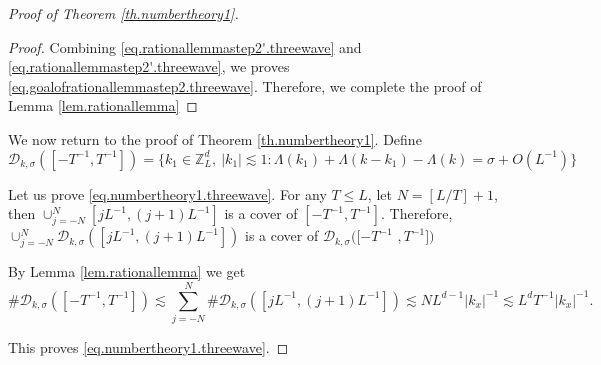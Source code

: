 \begin{proof}[Proof of Theorem \ref{th.numbertheory1}]
\begin{proof}
Combining \eqref{eq.rationallemmastep2'.threewave} and \eqref{eq.rationallemmastep2'.threewave}, we proves \eqref{eq.goalofrationallemmastep2.threewave}. Therefore, we complete the proof of Lemma \ref{lem.rationallemma}
\end{proof}

We now return to the proof of Theorem \ref{th.numbertheory1}. Define 
\begin{equation}
    \mathcal{D}_{k,\sigma}([-T^{-1},T^{-1} ])=\{k_1\in\mathbb{Z}^d_L,\ |k_1|\lesssim 1:\Lambda(k_1)+\Lambda(k-k_1)-\Lambda(k)=\sigma+O(L^{-1})\}
\end{equation}


Let us prove \eqref{eq.numbertheory1.threewave}. For any $T\le L$, let $N=[L/T]+1$, then $\cup_{j=-N}^N [jL^{-1}, (j+1)L^{-1}]$ is a cover of $[-T^{-1}, T^{-1}]$. Therefore, $\cup_{j=-N}^N\mathcal{D}_{k,\sigma}([jL^{-1}, (j+1)L^{-1}])$ is a cover of $\mathcal{D}_{k,\sigma}([-T^{-1}$ $,T^{-1} ])$

By Lemma \ref{lem.rationallemma} we get 
\begin{equation}\label{eq.thrationalexpand.threewave}
    \#\mathcal{D}_{k,\sigma}([-T^{-1},T^{-1} ])\lesssim \sum_{j=-N}^N\#\mathcal{D}_{k,\sigma}([jL^{-1}, (j+1)L^{-1}])\lesssim NL^{d-1} |k_x|^{-1}\lesssim L^dT^{-1}|k_x|^{-1}.
\end{equation}

This proves \eqref{eq.numbertheory1.threewave}.
\end{proof}


